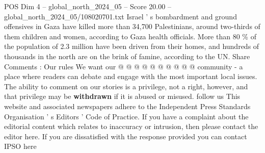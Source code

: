 \begin{textsample}{POS Dim 4 – global\_north\_2024\_05 – Score 20.00 – global\_north\_2024\_05/108020701.txt}
Israel ' s bombardment and ground offensives in Gaza have killed more than 34,700 Palestinians, around two-thirds of them children and women, according to Gaza health officials.
More than 80 \% of the population of 2.3 million have been driven from their homes, and hundreds of thousands in the north are on the brink of famine, according to the UN.
Share Comments : Our rules We want our @ @ @ @ @ @ @ @ @ @ community - a place where readers can debate and engage with the most important local issues.
The ability to comment on our stories is a privilege, not a right, however, and that privilege may be \textbf{withdrawn} if it is abused or misused. follow us This website and associated newspapers adhere to the Independent Press Standards Organisation ' s Editors ' Code of Practice.
If you have a complaint about the editorial content which relates to inaccuracy or intrusion, then please contact the editor here.
If you are dissatisfied with the response provided you can contact IPSO here

\end{textsample}
